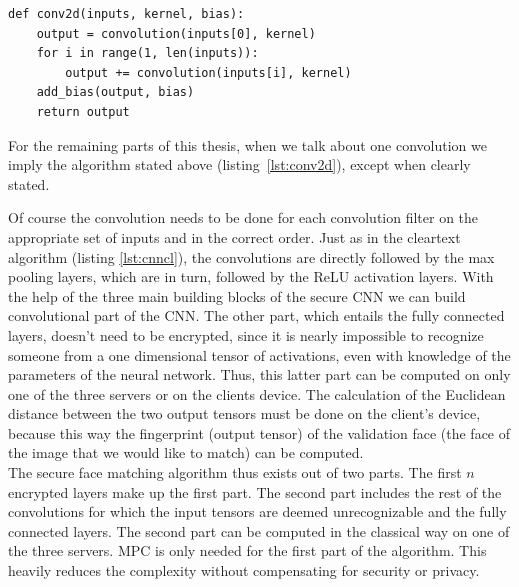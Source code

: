 \begin{lstlisting}[caption={Code for computing total 2D convolution}, label={lst:conv2d}, frame=single, breaklines=true]
def conv2d(inputs, kernel, bias):
    output = convolution(inputs[0], kernel)
    for i in range(1, len(inputs)):
        output += convolution(inputs[i], kernel)
    add_bias(output, bias)
    return output
\end{lstlisting}

For the remaining parts of this thesis, when we talk about one convolution we imply the algorithm stated above (listing~\ref{lst:conv2d}), except when clearly stated.

Of course the convolution needs to be done for each convolution filter on the appropriate set of inputs and in the correct order. Just as in the cleartext algorithm (listing \ref{lst:cnncl}), the convolutions are directly followed by the max pooling layers, which are in turn, followed by the ReLU activation layers. With the help of the three main building blocks of the secure CNN we can build convolutional part of the CNN. The other part, which entails the fully connected layers, doesn't need to be encrypted, since it is nearly impossible to recognize someone from a one dimensional tensor of activations, even with knowledge of the parameters of the neural network. Thus, this latter part can be computed on only one of the three servers or on the clients device. The calculation of the Euclidean distance between the two output tensors must be done on the client's device, because this way the fingerprint (output tensor) of the validation face (the face of the image that we would like to match) can be computed.\\

The secure face matching algorithm thus exists out of two parts. The first $n$ encrypted layers make up the first part. The second part includes the rest of the convolutions for which the input tensors are deemed unrecognizable and the fully connected layers. The second part can be computed in the classical way on one of the three servers. MPC is only needed for the first part of the algorithm. This heavily reduces the complexity without compensating for security or privacy.

